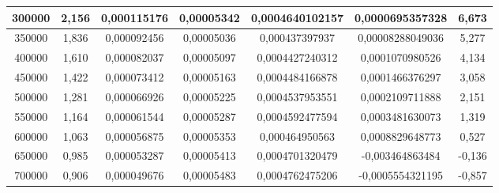 \begin{table}[!ht]
\begin{tabular}{|c|c|c|c|c|c|c|}
        300000	& 2,156	& 0,000115176	& 0,00005342 &	0,0004640102157	& 0,0000695357328	& 6,673 \\ \hline
        350000	& 1,836	& 0,000092456	& 0,00005036 &	0,000437397937	& 0,00008288049036	& 5,277 \\ \hline
        400000	& 1,610	& 0,000082037	& 0,00005097 &	0,0004427240312	& 0,0001070980526	& 4,134 \\ \hline
        450000	& 1,422	& 0,000073412	& 0,00005163 &	0,0004484166878	& 0,0001466376297	& 3,058 \\ \hline
        500000	& 1,281	& 0,000066926	& 0,00005225 &	0,0004537953551	& 0,0002109711888 &	2,151 \\ \hline
        550000	& 1,164	& 0,000061544	& 0,00005287 &	0,0004592477594	& 0,0003481630073	& 1,319 \\ \hline
        600000	& 1,063	& 0,000056875	& 0,00005353 &	0,000464950563	& 0,0008829648773	& 0,527 \\ \hline
        650000	& 0,985	& 0,000053287	& 0,00005413 &	0,0004701320479	& -0,003464863484 &	-0,136 \\ \hline
        700000	& 0,906	& 0,000049676	& 0,00005483 &	0,0004762475206	& -0,0005554321195 &	-0,857		\\ \hline		
        
    \end{tabular}
\end{table}